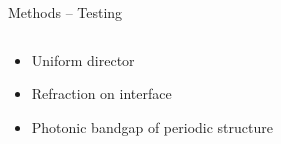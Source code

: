 \documentclass{beamer}
\newlength{\wideitemsep}
\let\olditem\item
\renewcommand{\item}{\setlength{\itemsep}{\wideitemsep}\olditem}
\begin{document}
\begin{frame}{Methods -- Testing}

\begin{block}{}
\begin{columns}
  \begin{column}{.4\textwidth}

  \begin{itemize}
    \item Uniform director
    \item Refraction on interface
    \item Photonic bandgap of periodic structure
  \end{itemize}
    
  \end{column}

\begin{column}{.5\textwidth}
  \scalebox{0.4}{}
\end{column}

\end{columns}


  \vspace{-25pt}
  \begin{figure}[h]
   \centering
  \end{figure}
  \vspace{-15pt}
\end{block}
\end{frame}
\end{document}
